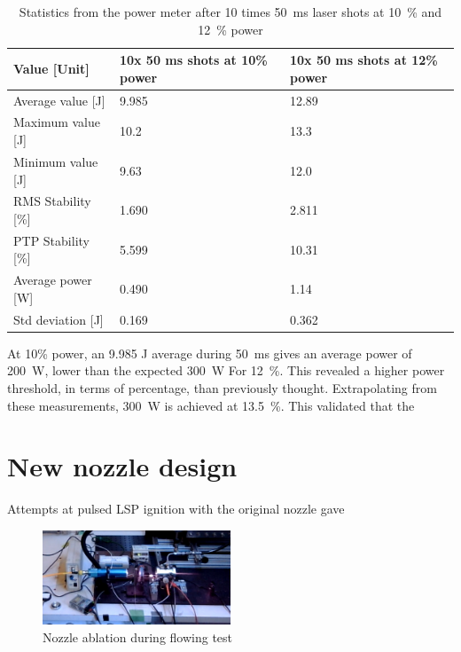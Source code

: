                 \begin{table}[!ht]
                    \caption{Statistics from the power meter after 10 times \qty{50}{ms} laser shots at \qty{10}{\%} and \qty{12}{\%} power}
                    \label{tab:laser shot statistics}
                    \begin{tabular}{lll}
                    \textbf{Value {[}Unit{]}} & \textbf{10x 50 ms shots at 10\% power} & \textbf{10x 50 ms shots at 12\% power} \\ \hline
                    Average value {[}J{]}  & 9.985 & 12.89 \\
                    Maximum value {[}J{]}  & 10.2  & 13.3  \\
                    Minimum value {[}J{]}  & 9.63  & 12.0  \\
                    RMS Stability {[}\%{]} & 1.690 & 2.811 \\
                    PTP Stability {[}\%{]} & 5.599 & 10.31 \\
                    Average power {[}W{]}  & 0.490 & 1.14  \\
                    Std deviation {[}J{]}  & 0.169 & 0.362 \\ \hline
                    \end{tabular}
                \end{table}
                
                At 10\% power, an 9.985 J average during \qty{50}{ms} gives an average power of \qty{200}{W}, lower than the expected \qty{300}{W} For \qty{12}{\%}. This revealed a higher power threshold, in terms of percentage, than previously thought. Extrapolating from these measurements, \qty{300}{W} is achieved at \qty{13.5}{\%}. This validated that the

            \section{New nozzle design}

                Attempts at pulsed LSP ignition with the original nozzle gave 

                \begin{figure}[!ht]
                    \centering
                    \includegraphics[width=0.5\textwidth]{assets/5 discussion/Nozzle ablation.png}
                    \caption{Nozzle ablation during flowing test}
                    \label{nozzle ablation}
                \end{figure}

